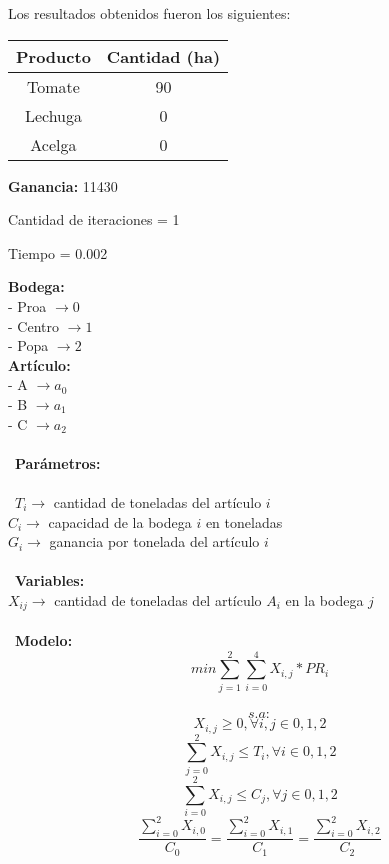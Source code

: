 \documentclass[titlepage, 11pt]{scrartcl}
\begin{document}
{\begin{description}
    		Los resultados obtenidos fueron los siguientes:
    			\begin{center}
   					\begin{tabular}{| c | c |}
   						\hline
   						Producto & Cantidad (ha) \\ \hline
   						Tomate & 90 \\
   						Lechuga & 0 \\
   						Acelga & 0 \\ \hline
   					\end{tabular}	
    			\end{center}

    	
    		\textbf{Ganancia: } 11430
    		
    		Cantidad de iteraciones = 1
    		
    		Tiempo = 0.002
    		
    		
    		
    		\item[2]   		
    		\textbf{Bodega:}\\
    		- Proa $\rightarrow 0$\\
    		- Centro $\rightarrow 1$\\
    		- Popa $\rightarrow 2$\\
			\textbf{Artículo:}\\
    		- A $\rightarrow a_0$\\
    		- B $\rightarrow a_1$\\
    		- C $\rightarrow a_2$\\
    		\\\
			\textbf{Parámetros:}\\        
    		\\\
    		$T_i  \rightarrow $ cantidad de toneladas del artículo $i$\\
    		$C_i \rightarrow $ capacidad de la bodega $i$ en toneladas\\
    		$G_i \rightarrow$ ganancia por tonelada del artículo $i$\\
    		\\\
    		\textbf{Variables:}\\
    		$X_{ij} \rightarrow$ cantidad de toneladas del artículo $A_i$ en la bodega $j$\\
    		\\\
    		\textbf{Modelo:}\\
    		$$min\sum_{j=1}^{2}\sum_{i=0}^{4}X_{i, j} * PR_{i}$$\\
    		
    		$$s.a:$$
    		$$X_{i, j} \geq 0, \forall i, j \in 0, 1, 2$$
    		$$\sum_{j=0}^{2}X_{i, j} \leq T_{i}, \forall i \in 0, 1, 2$$
    		$$\sum_{i=0}^{2}X_{i, j} \leq C_{j}, \forall j \in 0, 1, 2$$
    		$$\frac{\sum_{i=0}^{2}X_{i, 0}}{C_0} = \frac{\sum_{i=0}^{2}X_{i, 1}}{C_1} = \frac{\sum_{i=0}^{2}X_{i, 2}}{C_2}$$ 
    		

\end{description}}
\end{document}
